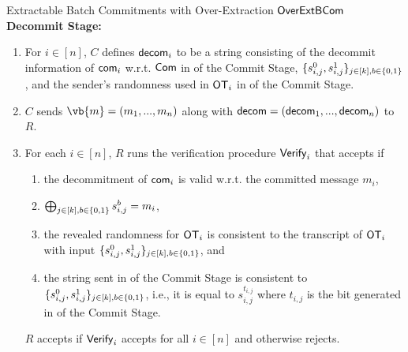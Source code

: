 \begin{ProtocolBox}[label={protocol:OverExtBCom}]{Extractable Batch Commitments with Over-Extraction $\mathsf{OverExtBCom}$}
{\bf Decommit Stage:} 
\begin{enumerate}
\item 
For $i\in[n]$, 
$C$ defines $\mathsf{decom}_i$ to be a string consisting of the decommit information of $\mathsf{com}_i$ w.r.t. $\mathsf{Com}$ in  of the Commit Stage, $\{s^{0}_{i,j},s^{1}_{i,j}\}_{j\in[k],b\in\{0,1\}}$, and the sender's randomness used in $\mathsf{OT}_i$ in  of the Commit Stage.
\item $C$ sends $\vb{m}=(m_1,...,m_n)$ along with $\mathsf{decom}=(\mathsf{decom}_1,...,\mathsf{decom}_n)$ to $R$.
\item 
For each $i\in [n]$, $R$ runs the verification procedure $\mathsf{Verify}_i$ that accepts if 
\begin{enumerate}
\item the decommitment of $\mathsf{com}_i$ is valid w.r.t. the committed message $m_i$,
\item $\bigoplus_{j\in[k],b\in\{0,1\}}s^{b}_{i,j}=m_i$,
\item the revealed randomness for $\mathsf{OT}_i$ is consistent to the transcript of $\mathsf{OT}_i$ with input $\{s^{0}_{i,j},s^{1}_{i,j}\}_{j\in[k],b\in\{0,1\}}$, and
\item the string sent in  of the Commit Stage is consistent to $\{s^{0}_{i,j},s^{1}_{i,j}\}_{j\in[k],b\in\{0,1\}}$, i.e., it is equal to $s_{i,j}^{t_{i,j}}$ where $t_{i,j}$ is the bit generated in  of the Commit Stage. 
\end{enumerate}
$R$ accepts if $\mathsf{Verify}_i$ accepts for all $i\in[n]$ and 
otherwise rejects. 
\end{enumerate}
\end{ProtocolBox}


